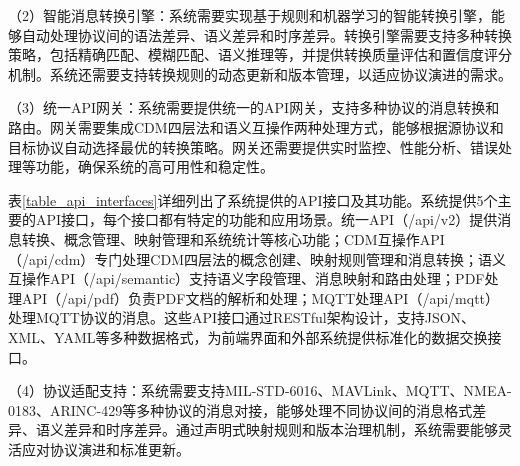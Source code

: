 （2）智能消息转换引擎：系统需要实现基于规则和机器学习的智能转换引擎，能够自动处理协议间的语法差异、语义差异和时序差异。转换引擎需要支持多种转换策略，包括精确匹配、模糊匹配、语义推理等，并提供转换质量评估和置信度评分机制。系统还需要支持转换规则的动态更新和版本管理，以适应协议演进的需求。

（3）统一API网关：系统需要提供统一的API网关，支持多种协议的消息转换和路由。网关需要集成CDM四层法和语义互操作两种处理方式，能够根据源协议和目标协议自动选择最优的转换策略。网关还需要提供实时监控、性能分析、错误处理等功能，确保系统的高可用性和稳定性。

表\ref{table_api_interfaces}详细列出了系统提供的API接口及其功能。系统提供5个主要的API接口，每个接口都有特定的功能和应用场景。统一API（/api/v2）提供消息转换、概念管理、映射管理和系统统计等核心功能；CDM互操作API（/api/cdm）专门处理CDM四层法的概念创建、映射规则管理和消息转换；语义互操作API（/api/semantic）支持语义字段管理、消息映射和路由处理；PDF处理API（/api/pdf）负责PDF文档的解析和处理；MQTT处理API（/api/mqtt）处理MQTT协议的消息。这些API接口通过RESTful架构设计，支持JSON、XML、YAML等多种数据格式，为前端界面和外部系统提供标准化的数据交换接口。

\begin{table}[!htb]
    \caption{系统API接口功能表}
    \label{table_api_interfaces}
    \centering
\end{table}

（4）协议适配支持：系统需要支持MIL-STD-6016、MAVLink、MQTT、NMEA-0183、ARINC-429等多种协议的消息对接，能够处理不同协议间的消息格式差异、语义差异和时序差异。通过声明式映射规则和版本治理机制，系统需要能够灵活应对协议演进和标准更新。


